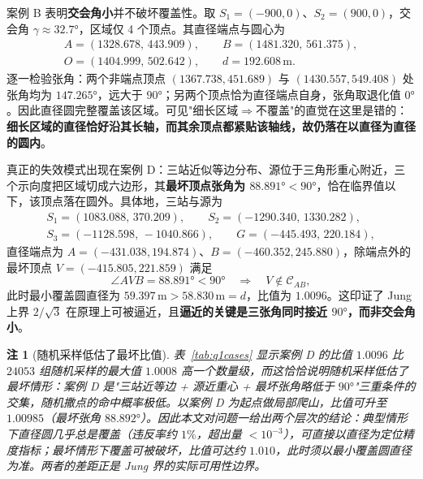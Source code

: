 \documentclass[12pt,a4paper]{ctexart}
\newtheorem{remark}{注}[section]
\begin{document}
案例 B 表明\textbf{交会角小}并不破坏覆盖性。取 $S_1=(-900,0)$、$S_2=(900,0)$，交会角 $\gamma\approx32.7°$，区域仅 4 个顶点。其直径端点与圆心为
\begin{equation}
  \begin{gathered}
    A=(1328.678,\,443.909),\qquad B=(1481.320,\,561.375),\\
    O=(1404.999,\,502.642),\qquad d=192.608\,\text{m}.
  \end{gathered}
  \label{eq:case-b-geom}
\end{equation}
逐一检验张角：两个非端点顶点 $(1367.738,451.689)$ 与 $(1430.557,549.408)$ 处张角均为 $147.265°$，远大于 $90°$；另两个顶点恰为直径端点自身，张角取退化值 $0°$。因此直径圆完整覆盖该区域。可见"细长区域$\Rightarrow$不覆盖"的直觉在这里是错的：\textbf{细长区域的直径恰好沿其长轴，而其余顶点都紧贴该轴线，故仍落在以直径为直径的圆内}。

真正的失效模式出现在案例 D：三站近似等边分布、源位于三角形重心附近，三个示向度把区域切成六边形，其\textbf{最坏顶点张角为 $88.891°<90°$}，恰在临界值以下，该顶点落在圆外。具体地，三站与源为
\begin{equation}
  \begin{gathered}
    S_1=(1083.088,\,370.209),\qquad S_2=(-1290.340,\,1330.282),\\
    S_3=(-1128.598,\,-1040.866),\qquad G=(-445.493,\,220.184),
  \end{gathered}
  \label{eq:case-d-geom}
\end{equation}
直径端点为 $A=(-431.038,194.874)$、$B=(-460.352,245.880)$，除端点外的最坏顶点 $V=(-415.805,221.859)$ 满足
\begin{equation}
  \angle AVB=88.891°<90°\quad\Longrightarrow\quad V\notin\mathcal{C}_{AB},
  \label{eq:thales-violate}
\end{equation}
此时最小覆盖圆直径为 $59.397\,\text{m} > 58.830\,\text{m} = d$，比值为 $1.0096$。这印证了 Jung 上界 $2/\sqrt{3}$ 在原理上可被逼近，且\textbf{逼近的关键是三张角同时接近 $90°$，而非交会角小}。

\begin{remark}[随机采样低估了最坏比值]
表~\ref{tab:q1cases} 显示案例 D 的比值 $1.0096$ 比 $24053$ 组随机采样的最大值 $1.0008$ 高一个数量级，而这恰恰说明随机采样\emph{低估}了最坏情形：案例 D 是"三站近等边 + 源近重心 + 最坏张角略低于 $90°$"三重条件的交集，随机撒点的命中概率极低。以案例 D 为起点做局部爬山，比值可升至 $1.00985$（最坏张角 $88.892°$）。因此本文对问题一给出两个层次的结论：\emph{典型}情形下直径圆几乎总是覆盖（违反率约 $1\%$，超出量 $<10^{-3}$），可直接以直径为定位精度指标；\emph{最坏}情形下覆盖可被破坏，比值可达约 $1.010$，此时须以最小覆盖圆直径为准。两者的差距正是 Jung 界的实际可用性边界。
\end{remark}
\end{document}
